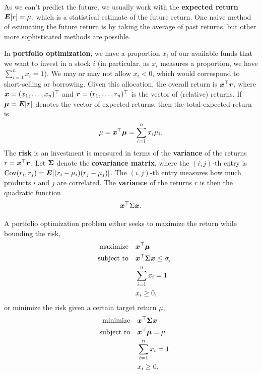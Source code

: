 As we can't predict the future, we usually work with the \textbf{expected return} $\bm{E}[r]=\mu$, which is a statistical estimate of the future return. One naive method of estimating the future return is by taking the average of past returns, but other more sophisticated methods are possible.

In \textbf{portfolio optimization}, we have a proportion $x_i$ of our available funds that we want to invest in a stock $i$ (in particular, as $x_i$ measures a proportion, we have $\sum_{i=1}^n x_i = 1$). We may or may not allow $x_i<0$, which would correspond to short-selling or borrowing. Given this allocation, the overall return is $\bm{x}^{\top}\bm{r}$, where $\bm{x}=(x_1,\dots,x_n)^{\top}$ and $\bm{r}=(r_1,\dots,r_n)^{\top}$ is the vector of (relative) returns.
If $\bm{\mu}=\bm{E}[\bm{r}]$ denotes the vector of expected returns, then the total expected return is 
\begin{equation*}
\mu = \bm{x}^{\top}\bm{\mu}=\sum_{i=1}^n x_i\mu_i.
\end{equation*} 
 The \textbf{risk} is an investment is measured in terms of the \textbf{variance} of the returns $r=\bm{x}^{\top}\bm{r}$. Let $\bm{\Sigma}$ denote the \textbf{covariance matrix}, where the $(i,j)$-th entry is $\mathrm{Cov}(r_i,r_j) = \bm{E}[(r_i-\mu_i)(r_j-\mu_j)]$. The $(i,j)$-th entry measures how much products $i$ and $j$ are correlated. The \textbf{variance} of the returns $r$ is then the quadratic function
 \begin{equation*}
   \bm{x}^{\top}\Sigma\bm{x}.
 \end{equation*} 
  
A portfolio optimization problem either seeks to maximize the return while bounding the risk,
 \begin{align*}
  \text{maximize}\quad & \bm{x}^{\top}\bm{\mu}\\
  \quad\text{subject to}\quad & \bm{x}^{\top}\bm{\Sigma}\bm{x}\leq \sigma,\\
  & \sum_{i=1}^n x_i=1\\
  & x_i\geq 0,
 \end{align*}
or minimize the risk given a certain target return $\mu$,
\begin{align*}
 \text{minimize}\quad & \bm{x}^{\top}\bm{\Sigma}\bm{x}\\
 \quad\text{subject to}\quad & \bm{x}^{\top}\bm{\mu} = \mu\\
 & \sum_{i=1}^n x_i = 1\\
 & x_i\geq 0.
\end{align*}

